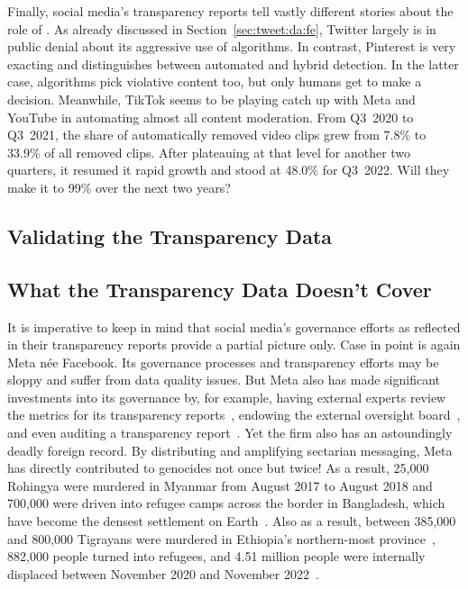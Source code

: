 Finally, social media's transparency reports tell vastly different stories about
the role of \AI. As already discussed in Section~\ref{sec:tweet:da:fe}, Twitter
largely is in public denial about its aggressive use of algorithms. In contrast,
Pinterest is very exacting and distinguishes between automated and hybrid
detection. In the latter case, algorithms pick violative content too, but only
humans get to make a decision. Meanwhile, TikTok seems to be playing catch up
with Meta and YouTube in automating almost all content moderation. From Q3~2020
to Q3~2021, the share of automatically removed video clips grew from 7.8\% to
33.9\% of all removed clips. After plateauing at that level for another two
quarters, it resumed it rapid growth and stood at 48.0\% for Q3~2022. Will they
make it to 99\% over the next two years?


\subsection{Validating the Transparency Data}
\label{sec:census:validation}




\subsection{What the Transparency Data Doesn't Cover}
\label{sec:census:limits}

It is imperative to keep in mind that social media's governance efforts as
reflected in their transparency reports provide a partial picture only. Case in
point is again Meta n\'ee Facebook. Its governance processes and transparency
efforts may be sloppy and suffer from data quality issues. But Meta also has
made significant investments into its governance by, for example, having
external experts review the metrics for its transparency
reports~\cite{BradfordGriselea2019}, endowing the external oversight
board~\cite{BoteroMarinoGreeneea2020}, and even auditing a transparency
report~\cite{Sarang2022}. Yet the firm also has an astoundingly deadly foreign
record. By distributing and amplifying sectarian messaging, Meta has directly
contributed to genocides not once but twice! As a result, 25,000 Rohingya were
murdered in Myanmar from August 2017 to August 2018 and 700,000 were driven into
refugee camps across the border in Bangladesh, which have become the densest
settlement on Earth~\cite{DeGuzman2022,HumanRightsCouncil2018}. Also as a
result, between 385,000 and 800,000 Tigrayans were murdered in Ethiopia's
northern-most province~\cite{AnnysVandenBemptea2021,ChothiaBekit2022}, 882,000
people turned into refugees, and 4.51 million people were internally displaced
between November 2020 and November 2022~\cite{UNICEF2023}.

